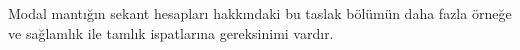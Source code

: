 \documentclass[../../../include/open-logic-chapter]{subfiles}
\begin{document}
\begin{editorial}
  Modal mantığın sekant hesapları hakkındaki bu taslak bölümün daha fazla
  örneğe ve sağlamlık ile tamlık ispatlarına gereksinimi vardır.
\end{editorial}


\OLEndChapterHook
\end{document}

